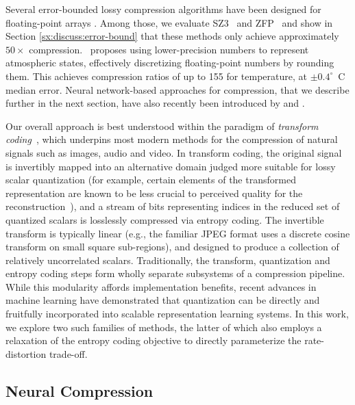 \documentclass[11pt, a4paper, logo, copyright, numbering]{googledeepmind}
\begin{document}
Several error-bounded lossy compression algorithms have been designed for floating-point arrays \citep{sz3_algo,sz3_framework,zfpy_2014,tthresh_2020,sperr_2023}. Among those, we evaluate SZ3~\citep{sz3_algo,sz3_framework} and ZFP~\citep{zfpy_2014} and show in Section \ref{sx:discuss:error-bound} that these methods only achieve approximately $50\times$ compression.
\citet{klower2021compressing}~proposes using lower-precision numbers to represent atmospheric states, effectively discretizing floating-point numbers by rounding them. This achieves compression ratios of up to 155 for temperature, at $\pm 0.4^\circ$~C median error. Neural network-based approaches for compression, that we describe further in the next section, have also recently been introduced by \citet{huang2022compressing} and \citet{han2024cra5}. 



Our overall approach is best understood within the paradigm of \emph{transform coding}~\citep{goyal2001theoretical}, which underpins most modern methods for the compression of natural signals such as images, audio and video.
In transform coding, the original signal is invertibly mapped into an alternative domain judged more suitable for lossy scalar quantization (for example, certain elements of the transformed representation are known to be less crucial to perceived quality for the reconstruction~\citep{wallace1992jpeg}), and a stream of bits representing indices in the reduced set of quantized scalars is losslessly compressed via entropy coding.
The invertible transform is typically linear (e.g., the familiar JPEG format uses a discrete cosine transform on small square sub-regions), and designed to produce a collection of relatively uncorrelated scalars.
Traditionally, the transform, quantization and entropy coding steps form wholly separate subsystems of a compression pipeline.
While this modularity affords implementation benefits, recent advances in machine learning have demonstrated that quantization can be directly and fruitfully incorporated into scalable representation learning systems.
In this work, we explore two such families of methods, the latter of which also employs a relaxation of the entropy coding objective to directly parameterize the rate-distortion trade-off.

\subsection{Neural Compression}
\label{sx:methods:networks}
\end{document}
